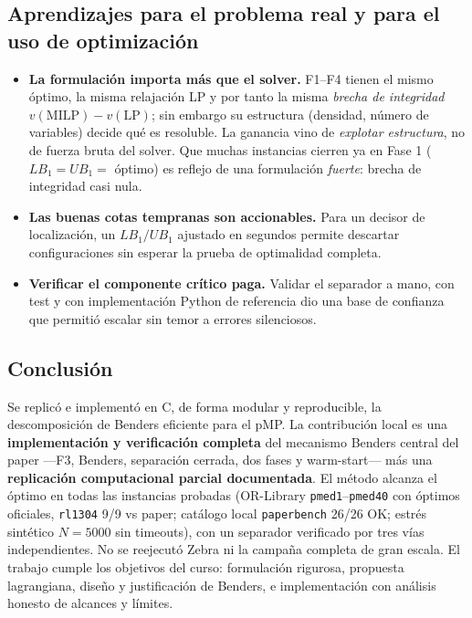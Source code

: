 \subsection{Aprendizajes para el problema real y para el uso de optimización}
\begin{itemize}[noitemsep]
  \item \textbf{La formulación importa más que el solver.} F1--F4 tienen el mismo óptimo, la misma
        relajación LP y por tanto la misma \emph{brecha de integridad}
        $v(\text{MILP})-v(\text{LP})$; sin embargo su estructura (densidad, número de variables)
        decide qué es resoluble. La ganancia vino de \emph{explotar estructura}, no de fuerza
        bruta del solver. Que muchas instancias cierren ya en Fase 1 ($LB_1=UB_1=$ óptimo) es
        reflejo de una formulación \emph{fuerte}: brecha de integridad casi nula.
  \item \textbf{Las buenas cotas tempranas son accionables.} Para un decisor de localización, un
        $LB_1/UB_1$ ajustado en segundos permite descartar configuraciones sin esperar la prueba
        de optimalidad completa.
  \item \textbf{Verificar el componente crítico paga.} Validar el separador a mano, con test y con
        implementación Python de referencia dio una base de confianza que permitió escalar sin temor a errores silenciosos.
\end{itemize}

\subsection{Conclusión}
Se replicó e implementó en C, de forma modular y reproducible, la descomposición de Benders
eficiente para el pMP. La contribución local es una \textbf{implementación y verificación completa} del
mecanismo Benders central del paper —F3, Benders, separación cerrada, dos fases y warm-start— más una
\textbf{replicación computacional parcial documentada}. El método alcanza el óptimo en todas las
instancias probadas (OR-Library \texttt{pmed1}--\texttt{pmed40} con óptimos oficiales,
\texttt{rl1304} 9/9 vs paper; catálogo local \texttt{paperbench} 26/26 OK; estrés sintético
$N=5000$ sin timeouts), con un separador verificado por tres vías independientes. No se
reejecutó Zebra ni la campaña completa de gran escala. El trabajo cumple los objetivos del curso:
formulación rigurosa, propuesta lagrangiana, diseño y justificación de Benders, e implementación
con análisis honesto de alcances y límites.
